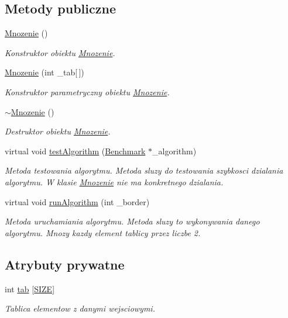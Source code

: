 \subsection*{Metody publiczne}
\begin{DoxyCompactItemize}
\item 
\hyperlink{class_mnozenie_aac38391baa7ffd14970526902ab750de}{Mnozenie} ()
\begin{DoxyCompactList}\small\item\em Konstruktor obiektu \hyperlink{class_mnozenie}{Mnozenie}. \end{DoxyCompactList}\item 
\hyperlink{class_mnozenie_a8babd869ba0bd289e1e4287d6d8b56f2}{Mnozenie} (int \-\_\-tab\mbox{[}$\,$\mbox{]})
\begin{DoxyCompactList}\small\item\em Konstruktor parametryczny obiektu \hyperlink{class_mnozenie}{Mnozenie}. \end{DoxyCompactList}\item 
\hyperlink{class_mnozenie_ad57f03bc66770fb6a442169781ee2156}{$\sim$\-Mnozenie} ()
\begin{DoxyCompactList}\small\item\em Destruktor obiektu \hyperlink{class_mnozenie}{Mnozenie}. \end{DoxyCompactList}\item 
virtual void \hyperlink{class_mnozenie_a039792aaa5ce9723cd61d29869cf0101}{test\-Algorithm} (\hyperlink{class_benchmark}{Benchmark} $\ast$\-\_\-algorithm)
\begin{DoxyCompactList}\small\item\em Metoda testowania algorytmu. Metoda sluzy do testowania szybkosci dzialania algorytmu. W klasie \hyperlink{class_mnozenie}{Mnozenie} nie ma konkretnego dzialania. \end{DoxyCompactList}\item 
virtual void \hyperlink{class_mnozenie_a46b1c55b7ba208fa137065147e107be9}{run\-Algorithm} (int \-\_\-border)
\begin{DoxyCompactList}\small\item\em Metoda uruchamiania algorytmu. Metoda sluzy to wykonywania danego algorytmu. Mnozy kazdy element tablicy przez liczbe 2. \end{DoxyCompactList}\end{DoxyCompactItemize}
\subsection*{Atrybuty prywatne}
\begin{DoxyCompactItemize}
\item 
int \hyperlink{class_mnozenie_a6dc67671f84a557d97c322b8af528359}{tab} \mbox{[}\hyperlink{benchmark_8hh_a70ed59adcb4159ac551058053e649640}{S\-I\-Z\-E}\mbox{]}
\begin{DoxyCompactList}\small\item\em Tablica elementow z danymi wejsciowymi. \end{DoxyCompactList}\end{DoxyCompactItemize}


